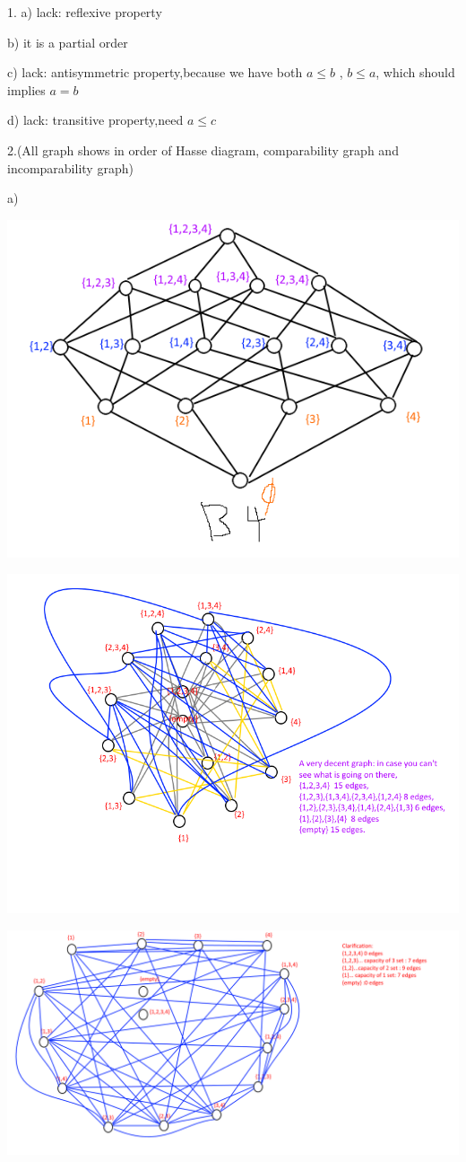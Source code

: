 \documentclass{article}
\begin{document}
1.
a) lack:
reflexive property

b) it is a partial order

c) lack:
antisymmetric property,because we have both $a \leq b$ , $b \leq a$,
which should implies $a = b$

d) lack:
transitive property,need $a \leq c$

2.(All graph shows in order of Hasse diagram, comparability graph and
incomparability graph)

a)

\includegraphics[scale=0.6]{HW12_2a.png}

\includegraphics[scale=0.5]{HW12_2a2.png}

\includegraphics[scale=0.5]{HW12_2a3.png}
\end{document}
